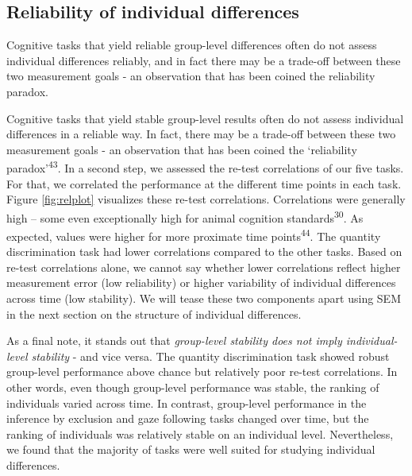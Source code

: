 \documentclass[
  man,floatsintext]{apa6}
\begin{document}
\hypertarget{reliability-of-individual-differences}{%
\subsection{Reliability of individual differences}\label{reliability-of-individual-differences}}

Cognitive tasks that yield reliable group-level differences often do not assess individual differences reliably, and in fact there may be a trade-off between these two measurement goals - an observation that has been coined the reliability paradox.

Cognitive tasks that yield stable group-level results often do not assess individual differences in a reliable way. In fact, there may be a trade-off between these two measurement goals - an observation that has been coined the `reliability paradox'\textsuperscript{43}. In a second step, we assessed the re-test correlations of our five tasks. For that, we correlated the performance at the different time points in each task. Figure \ref{fig:relplot} visualizes these re-test correlations. Correlations were generally high -- some even exceptionally high for animal cognition standards\textsuperscript{30}. As expected, values were higher for more proximate time points\textsuperscript{44}. The quantity discrimination task had lower correlations compared to the other tasks. Based on re-test correlations alone, we cannot say whether lower correlations reflect higher measurement error (low reliability) or higher variability of individual differences across time (low stability). We will tease these two components apart using SEM in the next section on the structure of individual differences.

As a final note, it stands out that \emph{group-level stability does not imply individual-level stability} - and vice versa. The quantity discrimination task showed robust group-level performance above chance but relatively poor re-test correlations. In other words, even though group-level performance was stable, the ranking of individuals varied across time. In contrast, group-level performance in the inference by exclusion and gaze following tasks changed over time, but the ranking of individuals was relatively stable on an individual level. Nevertheless, we found that the majority of tasks were well suited for studying individual differences.
\end{document}
